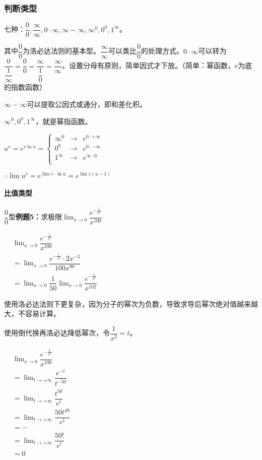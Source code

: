 \documentclass[UTF8, 12pt]{ctexart}
\begin{document}
\subsubsection{判断类型}

七种：$\dfrac{0}{0},\dfrac{\infty}{\infty},0\cdot\infty,\infty-\infty,\infty^0,0^0,1^\infty$。

其中$\dfrac{0}{0}$为洛必达法则的基本型。$\dfrac{\infty}{\infty}$可以类比$\dfrac{0}{0}$的处理方式。$0\cdot\infty$可以转为$\dfrac{0}{\dfrac{1}{\infty}}=\dfrac{0}{0}=\dfrac{\infty}{\dfrac{1}{0}}=\dfrac{\infty}{\infty}$。设置分母有原则，简单因式才下放。（简单：幂函数，e为底的指数函数）

$\infty-\infty$可以提取公因式或通分，即和差化积。

$\infty^0,0^0,1^\infty$，就是幂指函数。

$
u^v=e^{v\ln u}=\left\{
\begin{array}{lcl}
    \infty^0 & \rightarrow & e^{0\cdot+\infty} \\
    0^0 & \rightarrow & e^{0\cdot-\infty} \\
    1^\infty & \rightarrow & e^{\infty\cdot 0} \\
\end{array} \right.
$

$\therefore \lim u^v=e^{\lim v\cdot\ln u}=e^{\lim v(u-1)}$

\paragraph{比值类型} \leavevmode \bigskip

$\dfrac{0}{0}$型\textbf{例题5：}求极限$\lim_{x\to 0}\dfrac{e^{-\frac{1}{x^2}}}{x^{100}}$

$
\begin{aligned}
    & \lim_{x\to 0}\dfrac{e^{-\frac{1}{x^2}}}{x^{100}} \\
    & = \lim_{x\to 0}\dfrac{e^{-\frac{1}{x^2}}\cdot 2x^{-3}}{100x^99} \\
    & = \lim_{x\to 0}\dfrac{1}{50}\lim_{x\to 0}\dfrac{e^{-\frac{1}{x^2}}}{x^{102}}
\end{aligned}
$

\bigskip

使用洛必达法则下更复杂，因为分子的幂次为负数，导致求导后幂次绝对值越来越大，不容易计算。

使用倒代换再洛必达降低幂次，令$\dfrac{1}{x^2}=t$。

$
\begin{aligned}
    & \lim_{x\to 0}\dfrac{e^{-\frac{1}{x^2}}}{x^{100}} \\
    & = \lim_{t\to+\infty}\dfrac{e^{-t}}{t^{-50}} \\
    & = \lim_{t\to+\infty}\dfrac{t^{50}}{e^t} \\
    & = \lim_{t\to+\infty}\dfrac{50t^{49}}{e^t} \\
    & = \cdots \\
    & = \lim_{t\to+\infty}\dfrac{50!}{e^t} \\
    & = 0
\end{aligned}
$
\end{document}

